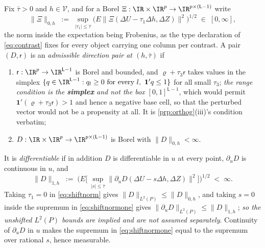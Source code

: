 \begin{definition}\label{def:dirclass}
Fix $\bar\tau>0$ and $h\in\mathcal V$, and for a Borel
$\Xi:\IR\times\IR^{p}\to\IR^{p\times(\mathsf L-1)}$ write
\begin{equation}\label{eq:shiftnorm}
\big\|\Xi\big\|_{0,h}\;:=\;\sup_{|\tau_1|\le\bar\tau}
\Big(E\big\|\Xi(\Delta U-\tau_1\Delta h,\Delta Z)\big\|^{2}\Big)^{1/2}
\;\in\;[0,\infty] ,
\end{equation}
the norm inside the expectation being Frobenius, as the type declaration of \eqref{eq:contrast} fixes
for every object carrying one column per contrast. A pair $(D,\mathsf r)$ is an \emph{admissible
direction pair at $(h,\bar\tau)$} if
\begin{enumerate}
\item[(a)] $\mathsf r:\IR^{p}\to\IR^{\mathsf L-1}$ is Borel and bounded, and $\varrho+\tau_3\mathsf r$
takes values in the simplex $\{q\in\IR^{\mathsf L-1}:q_l\ge0\ \text{for every }l,\ \mathbf 1'q\le1\}$
for all small $\tau_3$; \emph{the range condition is the \textbf{simplex} and not the box
$[0,1]^{\mathsf L-1}$}, which would permit $\mathbf 1'(\varrho+\tau_3\mathsf r)>1$ and hence a negative
base cell, so that the perturbed vector would not be a propensity at all. It is
\cref{prp:orthog}\textup{(iii)}'s condition verbatim;
\item[(b)] $D:\IR\times\IR^{p}\to\IR^{p\times(\mathsf L-1)}$ is Borel with $\|D\|_{0,h}<\infty$.
\end{enumerate}
It is \emph{differentiable} if in addition $D$ is differentiable in $u$ at every point, $\partial_uD$ is
continuous in $u$, and
\begin{equation}\label{eq:shiftnormone}
\big\|D\big\|_{1,h}\;:=\;\Big(E\Big[\ \sup_{|s|\le\bar\tau}\big\|\partial_uD(\Delta U-s\Delta h,\Delta Z)\big\|^{2}\Big]\Big)^{1/2}\;<\;\infty .
\end{equation}
Taking $\tau_1=0$ in \eqref{eq:shiftnorm} gives $\|D\|_{L^{2}(P)}\le\|D\|_{0,h}$, and taking $s=0$ inside
the supremum in \eqref{eq:shiftnormone} gives $\|\partial_uD\|_{L^{2}(P)}\le\|D\|_{1,h}$; \emph{so the
unshifted $L^{2}(P)$ bounds are implied and are not assumed separately}. Continuity of $\partial_uD$ in
$u$ makes the supremum in \eqref{eq:shiftnormone} equal to the supremum over rational $s$, hence
measurable.


\end{definition}
